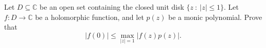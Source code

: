 \documentclass{article}
\begin{document}
\setlength{\parindent}{0pt}
Let \(\displaystyle D \subseteq \mathbb{C}\) be an open set containing the closed unit disk \(\displaystyle \{z\ :\ |z|\le 1\}\). Let \(\displaystyle f:D \to \mathbb{C}\) be a holomorphic function, and let \(\displaystyle p(z)\) be a monic polynomial. Prove that$$\big|f(0)\big| \le \max_{|z|=1} \big|f(z)p(z)\big|.$$
\end{document}
